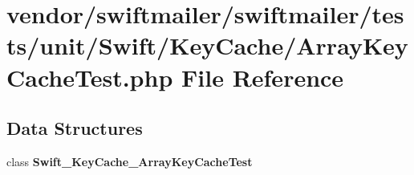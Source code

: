\section{vendor/swiftmailer/swiftmailer/tests/unit/\+Swift/\+Key\+Cache/\+Array\+Key\+Cache\+Test.php File Reference}
\label{_array_key_cache_test_8php}
\subsection*{Data Structures}
\begin{DoxyCompactItemize}
\item 
class {\bf Swift\+\_\+\+Key\+Cache\+\_\+\+Array\+Key\+Cache\+Test}
\end{DoxyCompactItemize}
